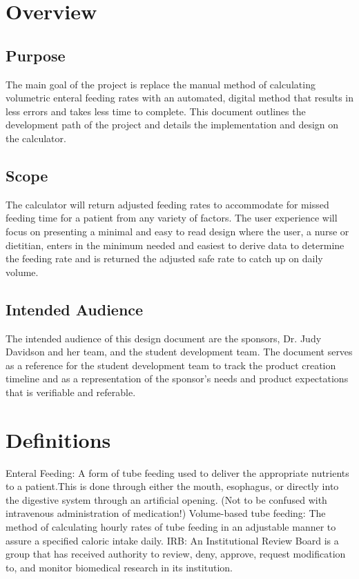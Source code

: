 \documentclass[onecolumn, draftclsnofoot,10pt, compsoc]{IEEEtran}
\begin{document}
\section{Overview}
\subsection{Purpose}
The main goal of the project is replace the manual method of calculating volumetric enteral feeding rates with an automated, digital method that results in less errors and takes less time to complete.
This document outlines the development path of the project and details the implementation and design on the calculator.
\subsection{Scope}
The calculator will return adjusted feeding rates to accommodate for missed feeding time for a patient from any variety of factors.
The user experience will focus on presenting a minimal and easy to read design where the user, a nurse or dietitian, enters in the minimum needed and easiest to derive data to determine the feeding rate and is returned the adjusted safe rate to catch up on daily volume.
\subsection{Intended Audience}
The intended audience of this design document are the sponsors, Dr. Judy Davidson and her team, and the student development team.
The document serves as a reference for the student development team to track the product creation timeline and as a representation of the sponsor's needs and product expectations that is verifiable and referable.
\section{Definitions}
Enteral Feeding: A form of tube feeding used to deliver the appropriate nutrients to a patient.This is done through either the mouth, esophagus, or directly into the digestive system through an artificial opening. (Not to be confused with intravenous administration of medication!)
\newline Volume-based tube feeding: The method of calculating hourly rates of tube feeding in an adjustable manner to assure a specified caloric intake daily.
\newline IRB:  An Institutional Review Board is a group that has received authority to review, deny, approve, request modification to, and monitor biomedical research in its institution.
\newline
\newline
\end{document}
